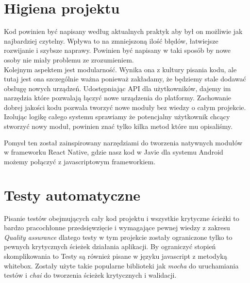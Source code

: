\section{Higiena projektu}
Kod powinien być napisany według aktualnych praktyk aby był on możliwie jak najbardziej czytelny. Wpływa to na zmniejszoną ilość błędów, łatwiejsze rozwijanie i szybsze naprawy. Powinien być napisany w taki sposób by nowe osoby nie miały problemu ze zrozumieniem. \\
Kolejnym aspektem jest modularność. Wynika ona z kultury pisania kodu, ale tutaj jest ona szczególnie ważna ponieważ zakładamy, że będziemy stale dodawać obsługę nowych urządzeń. Udostępniając API dla użytkowników, dajemy im narzędzia które pozwalają łączyć nowe urządzenia do platformy. Zachowanie dobrej jakości kodu pozwala tworzyć nowe moduły bez wiedzy o całym projekcie. Izolując logikę całego systemu sprawiamy że potencjalny użytkownik chcący stworzyć nowy moduł, powinien znać tylko kilka metod które mu opisaliśmy. 
\par Pomysł ten został zainspirowany narzędziami do tworzenia natywnych modułów w frameworku React Native, gdzie nasz kod w Javie dla systemu Android możemy połączyć z javascriptowym frameworkiem. 
\section{Testy automatyczne}
Pisanie testów obejmujących cały kod projektu i wszystkie krytyczne ścieżki to bardzo pracochłonne przedsięwzięcie i wymagające pewnej wiedzy z zakresu \textit{Quality assurance} dlatego testy w tym projekcie zostały ograniczone tylko to pewnych krytycznych ścieżek działania aplikacji. By ograniczyć stopień skomplikowania to Testy są również pisane w języku javascript z metodyką whitebox. Zostały użyte takie popularne biblioteki jak \textit{mocha} do uruchamiania testów i \textit{chai} do tworzenia ścieżek krytycznych i walidacji. \cite{chai, mocha}